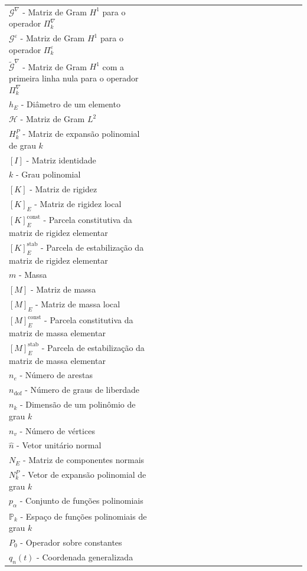 \begin{listasimb}
\begin{longtable}[l]{p{0.5\linewidth}p{15.0\linewidth}}
$\mathcal{G}^\nabla$ - Matriz de Gram $H^1$ para o operador $\Pi_k^\nabla$ \\
$\mathcal{G}^\varepsilon$ - Matriz de Gram $H^1$ para o operador $\Pi_k^\varepsilon$ \\
$\tilde{\mathcal{G}}^\nabla$ - Matriz de Gram $H^1$ com a primeira linha nula para o operador $\Pi_k^\nabla$ \\
$h_E$ - Diâmetro de um elemento \\
$\mathcal{H}$ - Matriz de Gram $L^2$ \\
$H_k^P$ - Matriz de expansão polinomial de grau $k$ \\
$\left[ I \right]$ - Matriz identidade \\
$k$ - Grau polinomial \\
$\left[ K \right]$ - Matriz de rigidez \\
$\left[ K \right]_E$ - Matriz de rigidez local \\
$\left[ K \right]_E^{\mathrm{const}}$ - Parcela constitutiva da matriz de rigidez elementar \\
$\left[ K \right]_E^{\mathrm{stab}}$ - Parcela de estabilização da matriz de rigidez elementar \\
$m$ - Massa \\
$\left[ M \right]$ - Matriz de massa \\
$\left[ M \right]_E$ - Matriz de massa local \\
$\left[ M \right]_E^{\mathrm{const}}$ - Parcela constitutiva da matriz de massa elementar \\
$\left[ M \right]_E^{\mathrm{stab}}$ - Parcela de estabilização da matriz de massa elementar \\
$n_e$ - Número de arestas \\
$n_{\mathrm{dof}}$ - Número de graus de liberdade \\
$n_k$ - Dimensão de um polinômio de grau $k$ \\
$n_v$ - Número de vértices \\
$\hat{n}$ - Vetor unitário normal \\
$N_E$ - Matriz de componentes normais \\
$N_k^P$ - Vetor de expansão polinomial de grau $k$ \\
$p_\alpha$ - Conjunto de funções polinomiais \\
$\mathbb{P}_k$ - Espaço de funções polinomiais de grau $k$ \\
$P_0$ - Operador sobre constantes \\
$q_n(t)$ - Coordenada generalizada \\

\end{longtable}
\end{listasimb}
